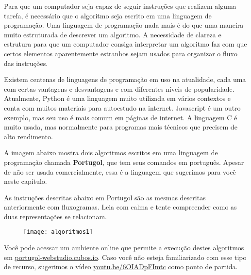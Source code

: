 \label{comp-know1}

Para que um computador seja capaz de seguir instruções que realizem alguma tarefa, é necessário que o algoritmo seja escrito em uma linguagem de programação. Uma linguagem de programação nada mais é do que uma maneira muito estruturada de descrever um algoritmo. A necessidade de clareza e estrutura para que um computador consiga interpretar um algoritmo faz com que certos elementos aparentemente estranhos sejam usados para organizar o fluxo das instruções.

\begin{knowledge}
Existem centenas de linguagens de programação em uso na atualidade, cada uma com certas vantagens e desvantagens e com diferentes níveis de popularidade. Atualmente, Python é uma linguagem muito utilizada em vários contextos e conta com muitos materiais para autoestudo na internet. Javascript é um outro exemplo, mas seu uso é mais comum em páginas de internet. A linguagem C é muito usada, mas normalmente para programas mais técnicos que precisem de alto rendimento.
\end{knowledge}

A imagem abaixo mostra dois algoritmos escritos em uma linguagem de programação chamada \textbf{Portugol}, que tem seus comandos em português. Apesar de não ser usada comercialmente, essa é a linguagem que sugerimos para você neste capítulo.

As instruções descritas abaixo em Portugol são as mesmas descritas anteriormente com fluxogramas. Leia com calma e tente compreender como as duas representações se relacionam.

\begin{figure}[H]
\centering

\texttt{[image: algoritmos1]}
\end{figure}

Você pode acessar um ambiente online que permite a execução destes algoritmos em \url{portugol-webstudio.cubos.io}. Caso você não esteja familiarizado com esse tipo de recurso, sugerimos o vídeo \url{youtu.be/6OIADpFImtc} como ponto de partida.

